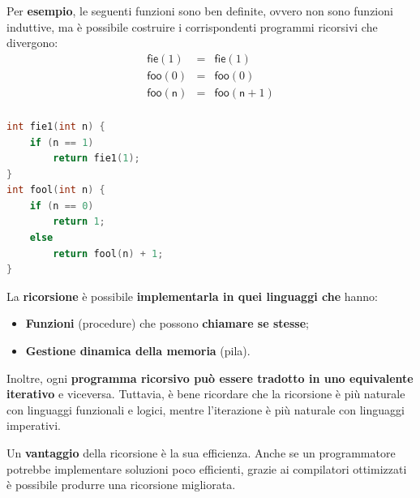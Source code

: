 \documentclass[a4paper]{article}
\begin{document}
	\noindent
	Per \textcolor{Green4}{\textbf{esempio}}, le seguenti funzioni sono ben definite, ovvero non sono funzioni induttive, ma è possibile costruire i corrispondenti programmi ricorsivi che divergono:
	\begin{equation*}
		\begin{array}{lll}
			\textsf{fie}\left(1\right) &=& \textsf{fie}\left(1\right) \\
			\textsf{foo}\left(0\right) &=& \textsf{foo}\left(0\right) \\
			\textsf{foo}\left(\textsf{n}\right) &=& \textsf{foo}\left(\textsf{n}+1\right) \\
		\end{array}
	\end{equation*}
	\begin{lstlisting}[language=C]
int fie1(int n) {
	if (n == 1)
		return fie1(1);
}
int fool(int n) {
	if (n == 0)
		return 1;
	else
		return fool(n) + 1;
}\end{lstlisting}
	La \textbf{ricorsione} è possibile \textbf{implementarla in quei linguaggi che} hanno:
	\begin{itemize}
		\item \textbf{Funzioni} (procedure) che possono \textbf{chiamare se stesse};
		
		\item \textbf{Gestione dinamica della memoria} (pila).
	\end{itemize}
	Inoltre, ogni \textbf{programma ricorsivo può essere tradotto in uno equivalente iterativo} e viceversa. Tuttavia, è bene ricordare che la ricorsione è più naturale con linguaggi funzionali e logici, mentre l'iterazione è più naturale con linguaggi imperativi.\newline
	
	\noindent
	Un \textcolor{Green4}{\textbf{vantaggio}} della ricorsione è la sua efficienza. Anche se un programmatore potrebbe implementare soluzioni poco efficienti, grazie ai compilatori ottimizzati è possibile produrre una ricorsione migliorata.\newpage
	
\end{document}
